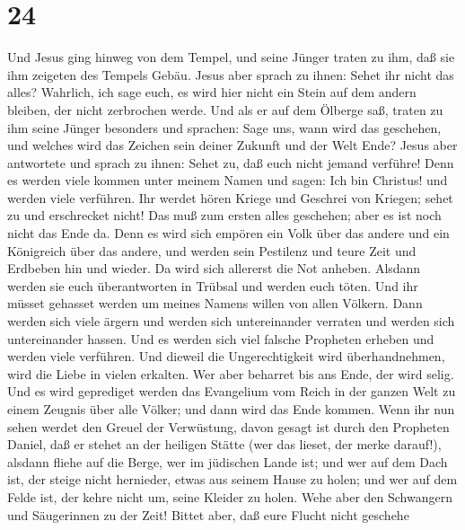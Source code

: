 \hypertarget{section-23}{%
\section{24}\label{section-23}}

 Und Jesus ging hinweg von dem Tempel, und seine Jünger
traten zu ihm, daß sie ihm zeigeten des Tempels Gebäu. 
Jesus aber sprach zu ihnen: Sehet ihr nicht das alles? Wahrlich, ich
sage euch, es wird hier nicht ein Stein auf dem andern bleiben, der
nicht zerbrochen werde.  Und als er auf dem Ölberge saß,
traten zu ihm seine Jünger besonders und sprachen: Sage uns, wann wird
das geschehen, und welches wird das Zeichen sein deiner Zukunft und der
Welt Ende?  Jesus aber antwortete und sprach zu ihnen: Sehet
zu, daß euch nicht jemand verführe!  Denn es werden viele
kommen unter meinem Namen und sagen: Ich bin Christus! und werden viele
verführen.  Ihr werdet hören Kriege und Geschrei von
Kriegen; sehet zu und erschrecket nicht! Das muß zum ersten alles
geschehen; aber es ist noch nicht das Ende da.  Denn es wird
sich empören ein Volk über das andere und ein Königreich über das
andere, und werden sein Pestilenz und teure Zeit und Erdbeben hin und
wieder.  Da wird sich allererst die Not anheben.
 Alsdann werden sie euch überantworten in Trübsal und werden
euch töten. Und ihr müsset gehasset werden um meines Namens willen von
allen Völkern.  Dann werden sich viele ärgern und werden
sich untereinander verraten und werden sich untereinander hassen.
 Und es werden sich viel falsche Propheten erheben und
werden viele verführen.  Und dieweil die Ungerechtigkeit
wird überhandnehmen, wird die Liebe in vielen erkalten. 
Wer aber beharret bis ans Ende, der wird selig.  Und es
wird geprediget werden das Evangelium vom Reich in der ganzen Welt zu
einem Zeugnis über alle Völker; und dann wird das Ende kommen.
 Wenn ihr nun sehen werdet den Greuel der Verwüstung, davon
gesagt ist durch den Propheten Daniel, daß er stehet an der heiligen
Stätte (wer das lieset, der merke darauf!),  alsdann fliehe
auf die Berge, wer im jüdischen Lande ist;  und wer auf dem
Dach ist, der steige nicht hernieder, etwas aus seinem Hause zu holen;
 und wer auf dem Felde ist, der kehre nicht um, seine
Kleider zu holen.  Wehe aber den Schwangern und Säugerinnen
zu der Zeit!  Bittet aber, daß eure Flucht nicht geschehe
